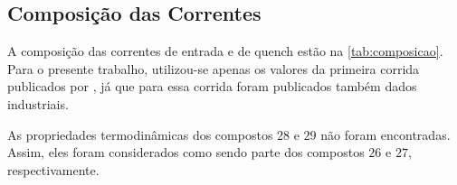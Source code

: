 
\subsection{Composição das Correntes} \label{sec:composicaocorrentes}

A composição das correntes de entrada e de quench estão na
\autoref{tab:composicao}. Para o presente trabalho, utilizou-se
apenas os valores da primeira corrida publicados por
, já que para essa corrida foram publicados
também dados industriais.

As propriedades termodinâmicas dos compostos $28$ e $29$ não foram
encontradas. Assim, eles foram considerados como sendo parte dos compostos
$26$ e $27$, respectivamente.


